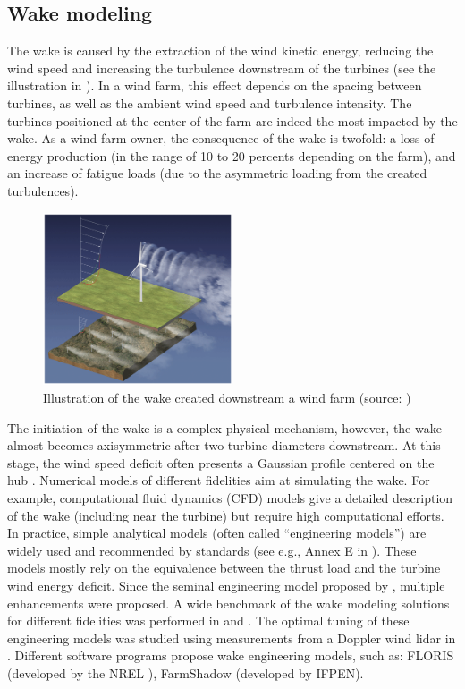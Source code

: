 \subsection{Wake modeling}\label{sec:222}

The wake is caused by the extraction of the wind kinetic energy, reducing the wind speed and increasing the turbulence downstream of the turbines (see the illustration in ). 
In a wind farm, this effect depends on the spacing between turbines, as well as the ambient wind speed and turbulence intensity. 
The turbines positioned at the center of the farm are indeed the most impacted by the wake. 
As a wind farm owner, the consequence of the wake is twofold: a loss of energy production (in the range of 10 to 20 percents depending on the farm), and an increase of fatigue loads (due to the asymmetric loading from the created turbulences).

\begin{figure}%
    \centering
    \includegraphics[width=0.5\textwidth]{./part1/figures/wake.png}
    \caption{Illustration of the wake created downstream a wind farm (source: \citealt{veers_2019_review})} 
    \label{fig:wake_illustration}
\end{figure}

The initiation of the wake is a complex physical mechanism, however, the wake almost becomes axisymmetric after two turbine diameters downstream. 
At this stage, the wind speed deficit often presents a Gaussian profile centered on the hub \citep{burton_2021_wind_handbook}. 
Numerical models of different fidelities aim at simulating the wake. 
For example, computational fluid dynamics (CFD) models give a detailed description of the wake (including near the turbine) but require high computational efforts. 
In practice, simple analytical models (often called ``engineering models'') are widely used and recommended by standards (see e.g., Annex E in \citealt{iec_2019}). 
These models mostly rely on the equivalence between the thrust load and the turbine wind energy deficit. 
Since the seminal engineering model proposed by \citet{jensen_1983_wake}, multiple enhancements were proposed. 
A wide benchmark of the wake modeling solutions for different fidelities was performed in \citet{doubrawa_2020_benchmark} and \citet{hiperwind_2023_wp3}. 
The optimal tuning of these engineering models was studied using measurements from a Doppler wind lidar in \citet{zhan_2020_optimal_wake}. 
Different software programs propose wake engineering models, such as: FLORIS (developed by the NREL \citet{fleming_2020_FLORIS}), FarmShadow (developed by IFPEN). 

